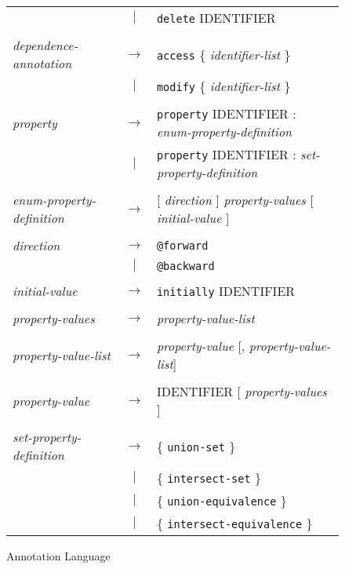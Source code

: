 \documentclass[times, 10pt]{article}
\begin{document}
\begin{figure}
\begin{tabular}[c]{l c l}
& $|$ & {\tt delete} IDENTIFIER \\
\\
{\it dependence-annotation} & $\rightarrow$ & {\tt access} \{ {\it identifier-list} \} \\
& $|$ & {\tt modify} \{ {\it identifier-list} \} \\
\\
{\it property} & $\rightarrow$ & {\tt property} IDENTIFIER : {\it enum-property-definition} \\
& $|$ & {\tt property} IDENTIFIER : {\it set-property-definition} \\
\\
{\it enum-property-definition} & $\rightarrow$ & [ {\it direction} ] {\it property-values } [ {\it initial-value} ] \\
\\
{\it direction} & $\rightarrow$ & {\tt @forward} \\
& $|$ & {\tt @backward} \\
\\
{\it initial-value} & $\rightarrow$ & {\tt initially} IDENTIFIER \\
\\
{\it property-values} & $\rightarrow$ & {\it property-value-list} \\
\\
{\it property-value-list} & $\rightarrow$ & {\it property-value} [, {\it property-value-list}]\\
\\
{\it property-value} & $\rightarrow$ & IDENTIFIER [ {\it property-values} ] \\
\\
{\it set-property-definition} & $\rightarrow$ & \{ {\tt union-set} \} \\
& $|$ & \{ {\tt intersect-set} \} \\
& $|$ & \{ {\tt union-equivalence} \} \\
& $|$ & \{ {\tt intersect-equivalence} \} \\
\end{tabular}
\caption{Annotation Language}
\label{annbnf1}
\end{figure}
\end{document}
